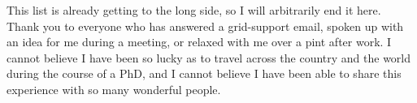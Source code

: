 This list is already getting to the long side, so I will arbitrarily end it here. Thank you to everyone who has answered a grid-support email, spoken up with an idea for me during a meeting, or relaxed with me over a pint after work. I cannot believe I have been so lucky as to travel across the country and the world during the course of a PhD, and I cannot believe I have been able to share this experience with so many wonderful people.

